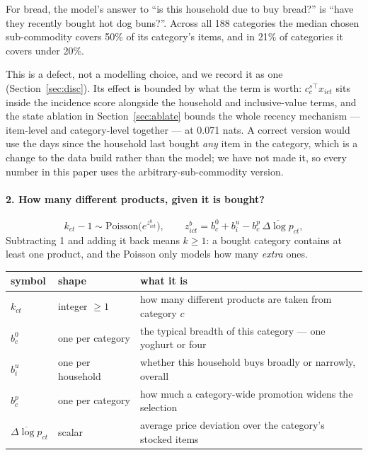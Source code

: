\documentclass[11pt]{article}
\begin{document}
For bread, the model's answer to ``is this household due to buy bread?'' is ``have they
recently bought hot dog buns?''. Across all 188 categories the median chosen
sub-commodity covers 50\% of its category's items, and in 21\% of categories it
covers under 20\%.

This is a defect, not a modelling choice, and we record it as one (Section~\ref{sec:disc}).
Its effect is bounded by what the term is worth: $c^{s\top}_c x_{ict}$ sits inside the
incidence score alongside the household and inclusive-value terms, and the state ablation
in Section~\ref{sec:ablate} bounds the whole recency mechanism --- item-level and
category-level together --- at 0.071 nats. A correct version would use the days since
the household last bought \emph{any} item in the category, which is a change to the data
build rather than the model; we have not made it, so every number in this paper uses the
arbitrary-sub-commodity version.

\paragraph{2. How many different products, given it is bought?}
\begin{equation}
k_{ct}-1\sim\mathrm{Poisson}\bigl(e^{z^b_{ict}}\bigr),\qquad
z^b_{ict}=b^0_c+b^u_i-b^p_c\,\overline{\Delta\log p}_{ct},
\label{eq:brd}
\end{equation}
Subtracting 1 and adding it back means $k\ge1$: a bought category contains at least one
product, and the Poisson only models how many \emph{extra} ones.

\begin{center}
\begin{tabular}{lll}
\toprule
symbol & shape & what it is \\
\midrule
$k_{ct}$ & integer $\ge1$ & how many different products are taken from category $c$ \\
$b^0_c$ & one per category & the typical breadth of this category --- one yoghurt or four \\
$b^u_i$ & one per household & whether this household buys broadly or narrowly, overall \\
$b^p_c$ & one per category & how much a category-wide promotion widens the selection \\
$\overline{\Delta\log p}_{ct}$ & scalar & average price deviation over the category's stocked items \\
\bottomrule
\end{tabular}
\end{center}
\end{document}
